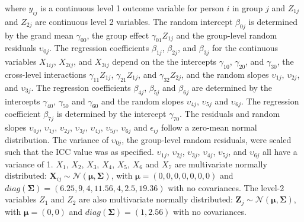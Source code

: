 \documentclass[10pt, a4paper, titlepage]{article}
\begin{document}
where $y_{ij}$ is a continuous level 1 outcome variable for person $i$ in group $j$ and $Z_{1j}$ and $Z_{2j}$ are continuous level 2 variables. The random intercept $\beta_{0j}$ is determined by the grand mean $\gamma_{00}$, the group effect $\gamma_{01}Z_{1j}$ and the group-level random residuals $\upsilon_{0j}$. The regression coefficients $\beta_{1j}$, $\beta_{2j}$, and $\beta_{3j}$ for the continuous variables $X_{1ij}$, $X_{2ij}$, and $X_{3ij}$ depend on the the intercepts $\gamma_{10}$, $\gamma_{20}$, and $\gamma_{30}$, the cross-level interactions $\gamma_{11}Z_{1j}$, $\gamma_{21}Z_{1j}$, and $\gamma_{32}Z_{2j}$, and the random slopes $\upsilon_{1j}$, $\upsilon_{2j}$, and $\upsilon_{3j}$. The regression coefficients $\beta_{4j}$, $\beta_{5j}$ and $\beta_{6j}$ are determined by the intercepts $\gamma_{40}$, $\gamma_{50}$ and $\gamma_{60}$ and the random slopes $\upsilon_{4j}$, $\upsilon_{5j}$ and $\upsilon_{6j}$. The regression coefficient $\beta_{7j}$ is determined by the intercept $\gamma_{70}$. The residuals and random slopes $\upsilon_{0j}$, $\upsilon_{1j}$, $\upsilon_{2j}$, $\upsilon_{3j}$, $\upsilon_{4j}$, $\upsilon_{5j}$, $\upsilon_{6j}$ and $\epsilon_{ij}$ follow a zero-mean normal distribution. The variance of $\upsilon_{0j}$, the group-level random residuals, were scaled such that the ICC value was as specified. $\upsilon_{1j}$, $\upsilon_{2j}$, $\upsilon_{3j}$, $\upsilon_{4j}$, $\upsilon_{5j}$, and $\upsilon_{6j}$ all have a variance of 1. $X_1$, $X_2$, $X_3$, $X_4$, $X_5$, $X_6$ and $X_7$ are multivariate normally distributed: $\mathbf{X}_{ij} \sim \mathcal{N}(\boldsymbol{\mu}, \boldsymbol{\Sigma})$, with $\boldsymbol{\mu} = (0, 0, 0, 0, 0, 0, 0)$ and $diag(\boldsymbol{\Sigma}) = (6.25, 9, 4, 11.56, 4, 2.5, 19.36)$ with no covariances. The level-2 variables $Z_1$ and $Z_2$ are also multivariate normally distributed:  $\mathbf{Z}_{j} \sim \mathcal{N}(\boldsymbol{\mu}, \boldsymbol{\Sigma})$, with $\boldsymbol{\mu} = (0, 0)$ and $diag(\boldsymbol{\Sigma}) = (1, 2.56)$ with no covariances.
\end{document}
